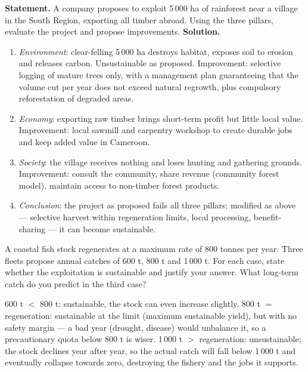 \documentclass[11pt]{article}
\begin{document}
\begin{exoresolu}
\textbf{Statement.} A company proposes to exploit 5\,000 ha of rainforest near a village in the South Region, exporting all timber abroad. Using the three pillars, evaluate the project and propose improvements.
\tcblower
\textbf{Solution.}
\begin{enumerate}
\item \emph{Environment}: clear-felling 5\,000 ha destroys habitat, exposes soil to erosion and releases carbon. Unsustainable as proposed. Improvement: selective logging of mature trees only, with a management plan guaranteeing that the volume cut per year does not exceed natural regrowth, plus compulsory reforestation of degraded areas.
\item \emph{Economy}: exporting raw timber brings short-term profit but little local value. Improvement: local sawmill and carpentry workshop to create durable jobs and keep added value in Cameroon.
\item \emph{Society}: the village receives nothing and loses hunting and gathering grounds. Improvement: consult the community, share revenue (community forest model), maintain access to non-timber forest products.
\item \emph{Conclusion}: the project as proposed fails all three pillars; modified as above — selective harvest within regeneration limits, local processing, benefit-sharing — it can become sustainable.
\end{enumerate}
\end{exoresolu}

\begin{exercice}
A coastal fish stock regenerates at a maximum rate of 800 tonnes per year. Three fleets propose annual catches of 600 t, 800 t and 1\,000 t. For each case, state whether the exploitation is sustainable and justify your answer. What long-term catch do you predict in the third case?
\end{exercice}

\begin{corrige}[Exercise 1]
600 t $<$ 800 t: sustainable, the stock can even increase slightly. 800 t $=$ regeneration: sustainable at the limit (maximum sustainable yield), but with no safety margin — a bad year (drought, disease) would unbalance it, so a precautionary quota below 800 t is wiser. 1\,000 t $>$ regeneration: unsustainable; the stock declines year after year, so the actual catch will fall below 1\,000 t and eventually collapse towards zero, destroying the fishery and the jobs it supports.
\end{corrige}
\end{document}
